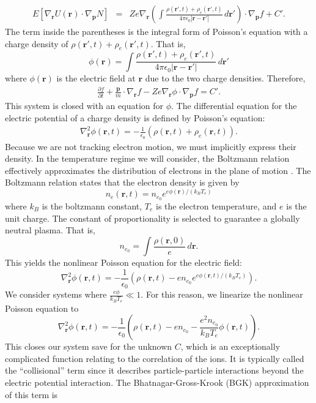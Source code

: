 \documentclass{article}
\begin{document}
\begin{align*}
E\left[\nabla_\mathbf{r} U(\mathbf{r})\cdot\nabla_\mathbf{p}N\right]&=&Ze\nabla_\mathbf{r}\left(\int\frac{\rho(\mathbf{r}',t)+\rho_e(\mathbf{r}',t)}{4\pi\epsilon_0|\mathbf{r}-\mathbf{r}'|}\,d\mathbf{r}'\right)\cdot\nabla_\mathbf{p} f+C'.
\end{align*}The term inside the parentheses is the integral form of Poisson's equation with a charge density of $\rho(\mathbf{r}',t)+\rho_e(\mathbf{r}',t)$. That is,
\[\phi(\mathbf{r})=\int\frac{\rho(\mathbf{r}',t)+\rho_e(\mathbf{r}',t)}{4\pi\epsilon_0|\mathbf{r}-\mathbf{r}'|}\,d\mathbf{r}'
\]where $\phi(\mathbf{r})$ is the electric field at $\mathbf{r}$ due to the two charge densities. Therefore,
\begin{align*}
\frac{\partial f}{\partial t}+\frac{\mathbf{p}}{m}\cdot\nabla_\mathbf{r} f-Ze\nabla_\mathbf{r}\phi\cdot\nabla_\mathbf{p}f=C'.
\end{align*}
This system is closed with an equation for $\phi$. The differential equation for the electric potential of a charge density is defined by Poisson's equation:
\begin{align*}
\nabla^2_\mathbf{r}\phi(\mathbf{r},t)=-\frac{1}{\epsilon_0}(\rho(\mathbf{r},t)+\rho_e(\mathbf{r},t)).
\end{align*}Because we are not tracking electron motion, we must implicitly express their density. In the temperature regime we will consider, the Boltzmann relation effectively approximates the distribution of electrons in the plane of motion \cite{franklin2000boltzmann}. The Boltzmann relation states that the electron density is given by
\[n_e(\mathbf{r},t)=n_{e_0}e^{e\phi(\mathbf{r})/(k_BT_e)}
\]where $k_B$ is the boltzmann constant, $T_e$ is the electron temperature, and $e$ is the unit charge. The constant of proportionality is selected to guarantee a globally neutral plasma. That is,
\[n_{e_0}=\int \frac{\rho(\mathbf{r},0)}{e}\,d\mathbf{r}.
\] This yields the nonlinear Poisson equation for the electric field:
\[\nabla^2_\mathbf{r}\phi(\mathbf{r},t)=-\frac{1}{\epsilon_0}\left(\rho(\mathbf{r},t)-en_{e_0}e^{e\phi(\mathbf{r},t)/(k_BT_e)}\right).
\]We consider systems where $\frac{e\phi}{k_BT_e}\ll1$. For this reason, we linearize the nonlinear Poisson equation to
\[\nabla^2_\mathbf{r}\phi(\mathbf{r},t)=-\frac{1}{\epsilon_0}\left(\rho(\mathbf{r},t)-en_{e_0}-\frac{e^2n_{e_0}}{k_BT_e}\phi(\mathbf{r},t)\right).
\]This closes our system save for the unknown $C$, which is an exceptionally complicated function relating to the correlation of the ions. It is typically called the ``collisional'' term since it describes particle-particle interactions beyond the electric potential interaction. The Bhatnagar-Gross-Krook (BGK) approximation of this term is 
\end{document}
